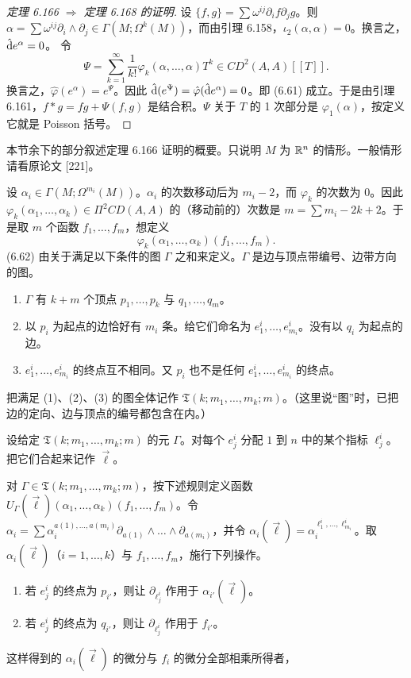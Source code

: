\begin{proof}[定理 6.166 $\Rightarrow$ 定理 6.168 的证明]
  设 $\{f,g\}=\sum\omega^{ij}\partial_if\partial_jg$。则 $\alpha=\sum\omega^{ij}\partial_i\wedge\partial_j\in\Gamma(M;\Omega^k(M))$，而由引理 6.158，$\iota_2(\alpha,\alpha)=0$。换言之，$\hat{\mathrm{d}} e^\alpha=0$。
  令
  \[
    \Psi=\sum_{k=1}^\infty\frac1{k!}\varphi_k(\alpha,\dots,\alpha)T^k\in CD^2(A,A)[[T]].
  \]
  换言之，$\hat\varphi(e^\alpha)=e^\Psi$。因此 $\hat{\mathrm{d}}(e^\Psi)=\hat\varphi(\hat{\mathrm{d}} e^\alpha)=0$。即 (6.61) 成立。于是由引理 6.161，$f*g=fg+\Psi(f,g)$ 是结合积。$\Psi$ 关于 $T$ 的 1 次部分是 $\varphi_1(\alpha)$，按定义它就是 Poisson 括号。
\end{proof}

本节余下的部分叙述定理 6.166 证明的概要。只说明 $M$ 为 $\mathbb{R}^n$ 的情形。一般情形请看原论文 [221]。

设 $\alpha_i\in\Gamma(M;\Omega^{m_i}(M))$。$\alpha_i$ 的次数移动后为 $m_i-2$，而 $\varphi_k$ 的次数为 $0$。因此 $\varphi_k(\alpha_1,\dots,\alpha_k)\in\Pi^2CD(A,A)$ 的（移动前的）次数是 $m=\sum m_i-2k+2$。于是取 $m$ 个函数 $f_1,\dots,f_m$，想定义
\begin{equation}
  \varphi_k(\alpha_1,\dots,\alpha_k)(f_1,\dots,f_m). \tag{6.62}
\end{equation}
(6.62) 由关于满足以下条件的图 $\Gamma$ 之和来定义。$\Gamma$ 是边与顶点带编号、边带方向的图。
\begin{enumerate}[label=（\arabic*）]
  \item $\Gamma$ 有 $k+m$ 个顶点 $p_1,\dots,p_k$ 与 $q_1,\dots,q_m$。
  \item 以 $p_i$ 为起点的边恰好有 $m_i$ 条。给它们命名为 $e^i_1,\dots,e^i_{m_i}$。没有以 $q_i$ 为起点的边。
  \item $e^i_1,\dots,e^i_{m_i}$ 的终点互不相同。又 $p_i$ 也不是任何 $e^i_1,\dots,e^i_{m_i}$ 的终点。
\end{enumerate}
把满足 (1)、(2)、(3) 的图全体记作 $\mathfrak{T}(k;m_1,\dots,m_k;m)$。（这里说“图”时，已把边的定向、边与顶点的编号都包含在内。）

设给定 $\mathfrak{T}(k;m_1,\dots,m_k;m)$ 的元 $\Gamma$。对每个 $e^i_j$ 分配 $1$ 到 $n$ 中的某个指标 $\ell^i_j$。把它们合起来记作 $\vec\ell$。

对 $\Gamma\in\mathfrak{T}(k;m_1,\dots,m_k;m)$，按下述规则定义函数 $U_\Gamma(\vec\ell)(\alpha_1,\dots,\alpha_k)(f_1,\dots,f_m)$。令 $\alpha_i=\sum\alpha^{a(1),\dots,a(m_i)}_i\partial_{a(1)}\wedge\dots\wedge\partial_{a(m_i)}$，并令 $\alpha_i(\vec\ell)=\alpha^{\ell^i_1,\dots,\ell^i_{m_i}}_i$。取 $\alpha_i(\vec\ell)$（$i=1,\dots,k$）与 $f_1,\dots,f_m$，施行下列操作。
\begin{enumerate}[label=（\arabic*）]
  \item 若 $e^i_j$ 的终点为 $p_{i'}$，则让 $\partial_{\ell^i_j}$ 作用于 $\alpha_{i'}(\vec\ell)$。
  \item 若 $e^i_j$ 的终点为 $q_{i'}$，则让 $\partial_{\ell^i_j}$ 作用于 $f_{i'}$。
\end{enumerate}
这样得到的 $\alpha_i(\vec\ell)$ 的微分与 $f_i$ 的微分全部相乘所得者，

